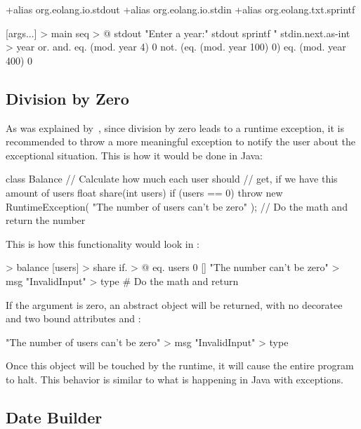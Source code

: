 \begin{ffcode}
+alias org.eolang.io.stdout
+alias org.eolang.io.stdin
+alias org.eolang.txt.sprintf

[args...] > main
  seq > @
    stdout
      "Enter a year:"
    stdout
      sprintf
        "%
        stdin.next.as-int > year
        or.
          and.
            eq. (mod. year 4) 0
            not. (eq. (mod. year 100) 0)
          eq. (mod. year 400) 0
\end{ffcode}

\subsection{Division by Zero}

As was explained by~\citet[p.314]{eckel2006thinking}, since division by zero
leads to a runtime exception, it is recommended to throw a more meaningful
exception to notify the user about the exceptional situation. This is how
it would be done in Java:

\begin{ffcode}
class Balance {
  // Calculate how much each user should
  // get, if we have this amount of users
  float share(int users) {
    if (users == 0) {
      throw new RuntimeException(
        "The number of users can't be zero"
      );
    }
    // Do the math and return the number
  }
}
\end{ffcode}

This is how this functionality would look in \eo{}:

\begin{ffcode}
[] > balance
  [users] > share
    if. > @
      eq. users 0
      []
        "The number can't be zero" > msg
        "InvalidInput" > type
      # Do the math and return
\end{ffcode}

If the  argument is zero, an abstract object
will be returned, with no decoratee and two bound attributes
 and :

\begin{ffcode}
[]
  "The number of users can't be zero" > msg
  "InvalidInput" > type
\end{ffcode}

Once this object will be touched by the runtime, it will cause
the entire program to halt. This behavior is similar to what
is happening in Java with exceptions.

\subsection{Date Builder}

